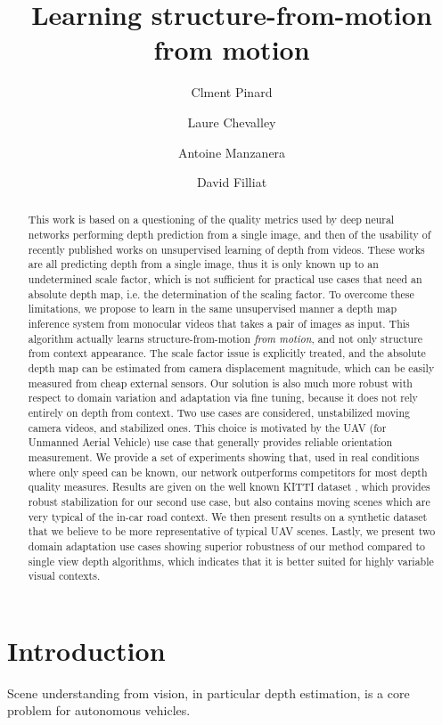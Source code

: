\documentclass[runningheads]{llncs}
\title{Learning
structure-from-motion
from motion}
\author{Clment Pinard\inst{1,2} \and Laure Chevalley\inst{2} \and Antoine Manzanera\inst{1} \and David Filliat\inst{1}
}
\institute{
ENSTA ParisTech \\
Computer Science and System Engineering Department\\
Palaiseau, France\\
\email{\{clement.pinard, antoine.manzanera, david.filliat\}@ensta-parsitech.fr}
\and
Parrot,
Paris, France\\
\email{laure.chevalley@parrot.com}
}
\begin{document}
\maketitle

\begin{abstract}
This work is based on a questioning of the quality metrics used by deep neural networks performing depth prediction from a single image, and then of the usability
of recently published works on unsupervised learning of depth from videos. These works are all predicting depth from a single image, thus it is only known up to an undetermined scale factor,
which is not sufficient for practical
use cases that need an absolute depth map, i.e. the determination of the scaling factor.
To overcome these limitations, we propose to learn in the same unsupervised manner a depth map inference system from monocular videos that takes a pair of images as input. This algorithm
actually
learns
structure-from-motion {\em from motion}, and not only structure from context appearance.
The scale factor issue is explicitly treated, and the absolute
depth map
can be estimated from camera displacement magnitude, which can be easily measured from cheap external sensors. Our solution is also
much more robust with respect to
domain variation and adaptation via
fine tuning,
because it does not rely entirely on depth from context. Two
use cases
are considered,
unstabilized moving camera videos,
and stabilized ones. This choice is motivated by the UAV (for Unmanned Aerial Vehicle)
use case
that generally provides reliable orientation measurement. We provide a set of experiments
showing that, used
in real conditions where only speed can be known, our network outperforms competitors for most depth quality measures. Results are given on the well known KITTI dataset \cite{geiger2013vision}, which provides robust stabilization for our second
use case,
but
also
contains moving scenes which are
very typical of the in-car road context. We then present results on a synthetic dataset that we believe to be more representative of typical UAV scenes. Lastly, we present two domain adaptation use cases showing superior robustness of our method compared to single view depth algorithms,
which indicates that
it is better suited for
highly variable visual contexts.
\end{abstract}

\section{Introduction}
\label{sec:intro}
Scene understanding from vision, in particular depth estimation, is a core problem for autonomous vehicles.
\end{document}
